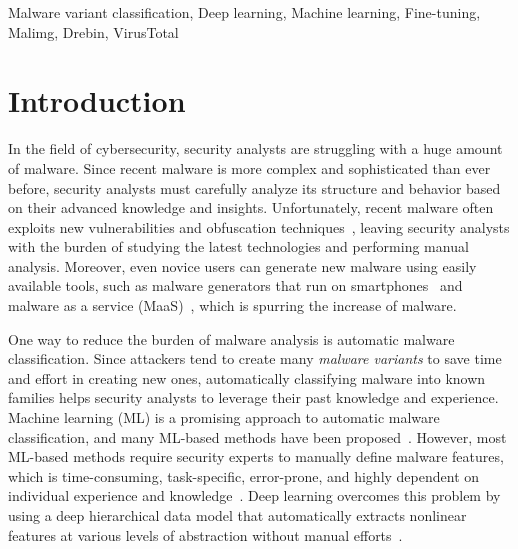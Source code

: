 \documentclass[conference]{IEEEtran}
\begin{document}
\begin{IEEEkeywords}
Malware variant classification, Deep learning, Machine learning, Fine-tuning, Malimg, Drebin, VirusTotal
\end{IEEEkeywords}

\section{Introduction}
\label{sec:introduction}

In the field of cybersecurity, security analysts are struggling with a huge amount of malware.
Since recent malware is more complex and sophisticated than ever before, security analysts must carefully analyze its structure and behavior based on their advanced knowledge and insights.
Unfortunately, recent malware often exploits new vulnerabilities and obfuscation techniques~\cite{McAfee2021}, leaving security analysts with the burden of studying the latest technologies and performing manual analysis.
Moreover, even novice users can generate new malware using easily available tools, such as malware generators that run on smartphones~\cite{Symantec} and malware as a service (MaaS)~\cite{Kaspersky}, which is spurring the increase of malware.

One way to reduce the burden of malware analysis is automatic malware classification.
Since attackers tend to create many \emph{malware variants}  to save time and effort in creating new ones, automatically classifying malware into known families helps security analysts to leverage their past knowledge and experience.
Machine learning (ML) is a promising approach to automatic malware classification, and many ML-based methods have been proposed~\cite{UCCI2019123,SINGH2021101861}.
However, most ML-based methods require security experts to manually define malware features, which is time-consuming, task-specific, error-prone, and highly dependent on individual experience and knowledge~\cite{10.1145/3417978}.
Deep learning overcomes this problem by using a deep hierarchical data model that automatically extracts nonlinear features at various levels of abstraction without manual efforts~\cite{10.1145/3417978}. 
\end{document}
